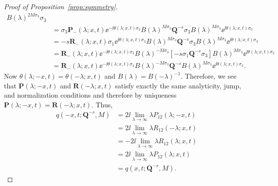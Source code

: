 \begin{proof}[Proof of Proposition~\ref{prop:symmetry}]
\begin{equation}
\begin{split}
B(\lambda)^{2M\sigma_3}
\sigma_3\\
&=\sigma_3\mathbf{P}_-(\lambda;x,t)\ee^{-\ii\theta(\lambda;x,t)\sigma_3}
B(\lambda)^{M\sigma_3}
\mathbf{Q}^{-s}\sigma_3 
B(\lambda)^{M\sigma_3}
\ee^{\ii\theta(\lambda;x,t)\sigma_3}\\
&=-s\mathbf{R}_-(\lambda;x,t)\sigma_1\ee^{\ii\theta(\lambda;x,t)\sigma_3}
B(\lambda)^{M\sigma_3}
\mathbf{Q}^{-s}\sigma_3
B(\lambda)^{M\sigma_3}
\ee^{\ii\theta(\lambda;x,t)\sigma_3}\\
&=\mathbf{R}_-(\lambda;x,t)\ee^{-\ii\theta(\lambda;x,t)\sigma_3}
B(\lambda)^{-M\sigma_3}
\left[-s\sigma_1\mathbf{Q}^{-s}\sigma_3\right]
B(\lambda)^{M\sigma_3}
\ee^{\ii\theta(\lambda;x,t)\sigma_3}\\
&=\mathbf{R}_-(\lambda;x,t)\ee^{-\ii\theta(\lambda;x,t)\sigma_3}
B(\lambda)^{-M\sigma_3}
\mathbf{Q}^{-s}
B(\lambda)^{M\sigma_3}
\ee^{\ii\theta(\lambda;x,t)\sigma_3}.
\end{split}
\end{equation}
Now $\theta(\lambda;-x,t)=\theta(-\lambda;x,t)$
and $B(\lambda)=B(-\lambda)^{-1}$.
Therefore, we see that $\mathbf{P}(\lambda;-x,t)$ and $\mathbf{R}(-\lambda;x,t)$ satisfy exactly the same analyticity, jump, and normalization conditions and therefore by uniqueness $\mathbf{P}(\lambda;-x,t)=\mathbf{R}(-\lambda;x,t)$.  Thus,
\begin{equation}
\begin{split}
q(-x,t;\mathbf{Q}^{-s},M)&=2\ii\lim_{\lambda\to\infty}\lambda P_{12}(\lambda;-x,t)\\
&=2\ii\lim_{\lambda\to\infty}\lambda R_{12}(-\lambda;x,t)\\
&=-2\ii\lim_{\lambda\to\infty}\lambda R_{12}(\lambda;x,t)\\
&=2\ii\lim_{\lambda\to\infty}\lambda P_{12}(\lambda;x,t)\\
&=q(x,t;\mathbf{Q}^{-s},M).
\end{split}

\end{equation}
\end{proof}
